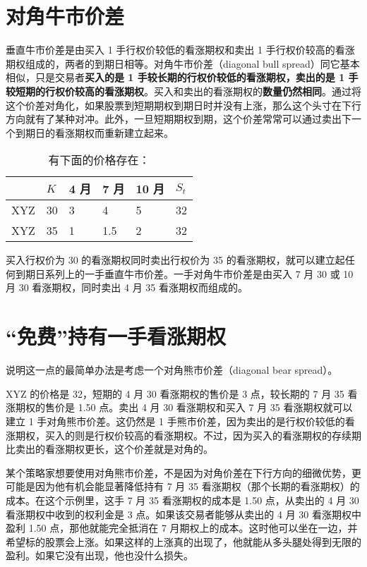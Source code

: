 \documentclass{article}
\begin{document}
\section{对角牛市价差}
垂直牛市价差是由买入 1 手行权价较低的看涨期权和卖出 1 手行权价较高的看涨期权组成的，两者的到期日相等。对角牛市价差（diagonal bull spread）同它基本相似，只是交易者\textbf{买入的是 1 手较长期的行权价较低的看涨期权，卖出的是 1 手较短期的行权价较高的看涨期权}。买入和卖出的看涨期权的\textbf{数量仍然相同}。通过将这个价差对角化，如果股票到短期期权到期日时并没有上涨，那么这个头寸在下行方向就有了某种对冲。此外，一旦短期期权到期，这个价差常常可以通过卖出下一个到期日的看涨期权而重新建立起来。

\begin{table}[!ht]
    \centering
    \caption{有下面的价格存在：}
    \begin{tabular}{llllll}
    \hline
         & $K$ & 4 月 & 7 月 & 10 月 & $S_t$ \\ \hline
        XYZ & 30 & 3 & 4 & 5 & 32 \\ 
        XYZ & 35 & 1 & 1.5 & 2 & 32 \\ \hline
    \end{tabular}
\end{table}

买入行权价为 30 的看涨期权同时卖出行权价为 35 的看涨期权，就可以建立起任何到期日系列上的一手垂直牛市价差。一手对角牛市价差是由买入 7 月 30 或 10 月 30 看涨期权，同时卖出 4 月 35 看涨期权而组成的。

\section{“免费”持有一手看涨期权}
说明这一点的最简单办法是考虑一个对角熊市价差（diagonal bear spread）。
\begin{tcolorbox}
    XYZ 的价格是 32，短期的 4 月 30 看涨期权的售价是 3 点，较长期的 7 月 35 看涨期权的售价是 1.50 点。卖出 4 月 30 看涨期权和买入 7 月 35 看涨期权就可以建立 1 手对角熊市价差。这仍然是 1 手熊市价差，因为卖出的是行权价较低的看涨期权，买入的则是行权价较高的看涨期权。不过，因为买入的看涨期权的存续期比卖出的看涨期权更长，这个价差就是对角的。
\end{tcolorbox}

某个策略家想要使用对角熊市价差，不是因为对角价差在下行方向的细微优势，更可能是因为他有机会能显著降低持有 7 月 35 看涨期权（那个长期的看涨期权）的成本。在这个示例里，这手 7 月 35 看涨期权的成本是 1.50 点，从卖出的 4 月 30 看涨期权中收到的权利金是 3 点。如果该交易者能够从卖出的 4 月 30 看涨期权中盈利 1.50 点，那他就能完全抵消在 7 月期权上的成本。这时他可以坐在一边，并希望标的股票会上涨。如果这样的上涨真的出现了，他就能从多头腿处得到无限的盈利。如果它没有出现，他也没什么损失。
\end{document}
